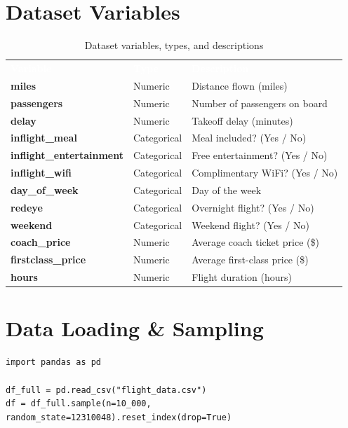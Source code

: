 \documentclass[12pt, a4paper]{report}
\newcommand{\thead}[1]{\cellcolor{themeHeaderBg}\textcolor{white}{\textbf{#1}}}
\newcommand{\talt}{\rowcolor{themeRowAlt}}
\newcommand{\trow}{\rowcolor{white}}
\begin{document}
\section{Dataset Variables}

\begin{table}[H]
\centering
\renewcommand{\arraystretch}{1.3}
\begin{tabularx}{\textwidth}{>{\bfseries}l l X}
\thead{Variable} & \thead{Type} & \thead{Description} \\
\talt miles               & Numeric     & Distance flown (miles) \\
\trow passengers          & Numeric     & Number of passengers on board \\
\talt delay               & Numeric     & Takeoff delay (minutes) \\
\trow inflight\_meal      & Categorical & Meal included? (Yes / No) \\
\talt inflight\_entertainment & Categorical & Free entertainment? (Yes / No) \\
\trow inflight\_wifi      & Categorical & Complimentary WiFi? (Yes / No) \\
\talt day\_of\_week       & Categorical & Day of the week \\
\trow redeye              & Categorical & Overnight flight? (Yes / No) \\
\talt weekend             & Categorical & Weekend flight? (Yes / No) \\
\trow coach\_price        & Numeric     & Average coach ticket price (\$) \\
\talt firstclass\_price   & Numeric     & Average first-class price (\$) \\
\trow hours               & Numeric     & Flight duration (hours) \\
\end{tabularx}
\caption{Dataset variables, types, and descriptions}
\end{table}

\section{Data Loading \& Sampling}

\begin{lstlisting}[style=python, caption={Python — Load dataset and draw 10{,}000-row reproducible sample}]
import pandas as pd

df_full = pd.read_csv("flight_data.csv")
df = df_full.sample(n=10_000, random_state=12310048).reset_index(drop=True)
\end{lstlisting}
\end{document}
